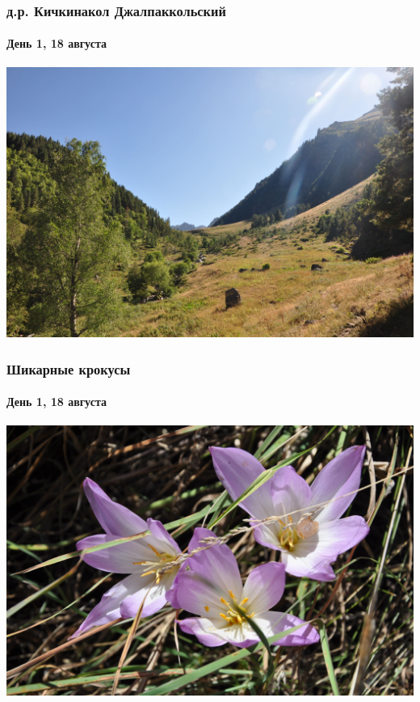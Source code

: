 \begin{frame}
{\begin{minipage}{\fourpicsize}
		\end{minipage}
		\hfill

	}
\end{frame}

\begin{frame}
	\frametitle{д.р. Кичкинакол Джалпаккольский}
	\framesubtitle{День 1, 18 августа}
	\centering
	\includegraphics[width=\linewidth]{../pics/DSC_0528}
\end{frame}

\begin{frame}
	\frametitle{Шикарные крокусы}
	\framesubtitle{День 1, 18 августа}
	\centering
	\includegraphics[width=\linewidth]{../pics/DSC_0534}
\end{frame}

